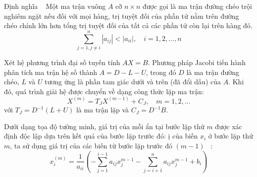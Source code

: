 


\begin{bt}{Định nghĩa ~\cite{dau2026hephuongtrinh}}
    Một ma trận vuông \(A\) cỡ \(n \times n\) được gọi là ma trận đường chéo trội nghiêm ngặt nếu đối với mọi hàng, trị tuyệt đối của phần tử nằm trên đường chéo chính lớn hơn tổng trị tuyệt đối của tất cả các phần tử còn lại trên hàng đó.$$\sum _{j=1,j\ne i}^{n}|a_{ij}|<|a_{ii}|,\quad i=1,2,\dots ,n$$
\end{bt}

Xét hệ phương trình đại số tuyến tính $AX = B$. Phương pháp Jacobi tiến hành phân tích ma trận hệ số thành $A = D - L - U$, trong đó $D$ là ma trận đường chéo, $L$ và $U$ tương ứng là phần tam giác dưới và trên (đã đổi dấu) của $A$. Khi đó, quá trình giải hệ được chuyển về dạng công thức lặp ma trận:
\begin{equation}
    X^{(m)} = T_J X^{(m-1)} + C_J, \quad m = 1, 2, \dots
\end{equation}
với $T_J = D^{-1}(L + U)$ là ma trận lặp và $C_J = D^{-1}B$.

Dưới dạng tọa độ tường minh, giá trị của mỗi ẩn tại bước lặp thứ $m$ được xác định độc lập dựa trên kết quả của bước lặp trước đó:
ị của biến \(x_{i}\) ở bước lặp thứ \(m\), ta sử dụng giá trị của các biến từ bước lặp trước đó \((m-1)\) ~\cite{dau2026hephuongtrinh}:\begin{equation}x_{i}^{(m)}=\frac{1}{a_{ii}}\left(-\sum _{j=1}^{i-1}a_{ij}x_{j}^{m-1}-\sum _{j=i+1}^{n}a_{ij}x_{j}^{m-1}+b_{i}\right)
\label{eq:sec3_1}\end{equation}
%     

